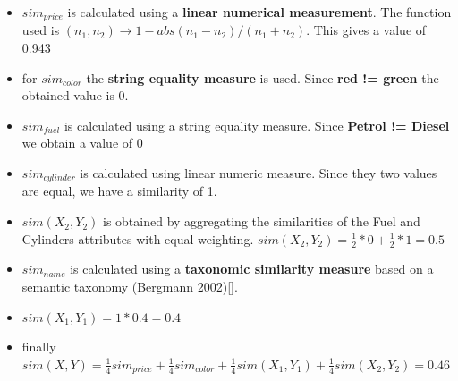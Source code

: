     \begin{itemize}
        \item $sim_{price}$ is calculated using a \textbf{linear numerical measurement}. The function used is $(n_1, n_2) \rightarrow 1 - abs(n_1 - n_2) / (n_1 + n_2)$. This gives a value of 0.943
        \item for $sim_{color}$ the \textbf{string equality measure} is used. Since \textbf{red != green} the obtained value is 0.
        \item $sim_{fuel}$ is calculated using a string equality measure. Since \textbf{Petrol != Diesel} we obtain a value of 0
        \item $sim_{cylinder}$ is calculated using linear numeric measure. Since they two values are equal, we have a similarity of 1.
        \item $sim(X_2, Y_2)$ is obtained by aggregating the similarities of the Fuel and Cylinders attributes with equal weighting. $sim(X_2, Y_2) = \frac{1}{2} * 0 + \frac{1}{2} * 1 = 0.5$
        \item $sim_{name}$ is calculated using a \textbf{taxonomic similarity measure} based on a semantic taxonomy (Bergmann 2002)[].
        \item $sim(X_1, Y_1) = 1 * 0.4 = 0.4$
        \item finally $sim(X, Y) = \frac{1}{4} sim_{price} + \frac{1}{4} sim_{color} + \frac{1}{4} sim(X_1, Y_1) + \frac{1}{4} sim(X_2, Y_2) = 0.46$

    \end{itemize}

